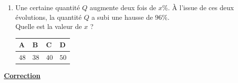 \documentclass[oneside,12pt]{exam}          %
\begin{document}
\begin{enumerate}[resume*]
	\item Une certaine quantité $Q$ augmente deux fois de $x$\%. À l'issue de ces deux évolutions, la quantité $Q$ a subi une hausse de $96$\%. \\
	Quelle est la valeur de $x$ ?
	
		\hspace{\linewidth-\textwidth}
		\renewcommand{\arraystretch}{1.5}
		\begin{tabular}{| P{0.22\textwidth} | P{0.22\textwidth} | P{0.22\textwidth} | P{0.22\textwidth} |} \hline
			A & B & C & D \\ \hline
			$48$ & $38$ & $40$ & $50$ \\ \hline
		\end{tabular}	
		
\end{enumerate}



\newpage

\begin{center}
	\textbf{\underline{\Large Correction}}
\end{center}
\end{document}
